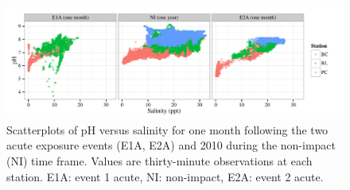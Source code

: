 \documentclass[letterpaper,12pt]{article}\usepackage[]{graphicx}\usepackage[]{color}
\makeatletter
\def\maxwidth{ %
  \ifdim\Gin@nat@width>\linewidth
    \linewidth
  \else
    \Gin@nat@width
  \fi
}
\makeatother
\begin{document}
\clearpage

\begin{figure}[!ht]

{\centering \includegraphics[width=\maxwidth]{figs/phvsal2-1} 

}

\caption[Scatterplots of pH versus salinity for one month following the two acute exposure events (E1A, E2A) and 2010 during the non-impact (NI) time frame]{Scatterplots of pH versus salinity for one month following the two acute exposure events (E1A, E2A) and 2010 during the non-impact (NI) time frame.  Values are thirty-minute observations at each station. E1A: event 1 acute, NI: non-impact, E2A: event 2 acute.}\label{fig:phvsal2}
\end{figure}


\clearpage
\end{document}
